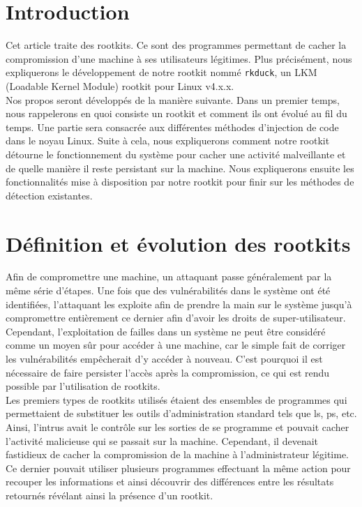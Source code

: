 \documentclass[11pt]{article}
\begin{document}
\newcommand*{\escape}[1]{\texttt{\textbackslash#1}}
\newcommand*{\escapeI}[1]{\texttt{\expandafter\string\csname #1\endcsname}}
\newcommand*{\escapeII}[1]{\texttt{\char`\\#1}}


\section*{Introduction}

    Cet article traite des rootkits. Ce sont des programmes permettant de cacher la compromission d'une machine à ses utilisateurs légitimes. Plus précisément, nous expliquerons le développement de notre rootkit nommé \texttt{rkduck}, un LKM (Loadable Kernel Module) rootkit pour Linux v4.x.x. \\

    Nos propos seront développés de la manière suivante. Dans un premier temps, nous rappelerons en quoi consiste un rootkit et comment ils ont évolué au fil du temps. Une partie sera consacrée aux différentes méthodes d'injection de code dans le noyau Linux. Suite à cela, nous expliquerons comment notre rootkit détourne le fonctionnement du système pour cacher une activité malveillante et de quelle manière il reste persistant sur la machine. Nous expliquerons ensuite les fonctionnalités mise à disposition par notre rootkit pour finir sur les méthodes de détection existantes.

\section{Définition et évolution des rootkits}

    Afin de compromettre une machine, un attaquant passe généralement par la même série d'étapes. Une fois que des vulnérabilités dans le système ont été identifiées, l'attaquant les exploite afin de prendre la main sur le système jusqu'à compromettre entièrement ce dernier afin d'avoir les droits de super-utilisateur.
    Cependant, l'exploitation de failles dans un système ne peut être considéré comme un moyen sûr pour accéder à une machine, car le simple fait de corriger les vulnérabilités empêcherait d'y accéder à nouveau. C'est pourquoi il est nécessaire de faire persister l'accès après la compromission, ce qui est rendu possible par l'utilisation de rootkits.\\
    
    Les premiers types de rootkits utilisés étaient des ensembles de programmes qui permettaient de substituer les outils d'administration standard tels que ls, ps, etc. Ainsi, l'intrus avait le contrôle sur les sorties de se programme et pouvait cacher l'activité malicieuse qui se passait sur la machine. Cependant, il devenait fastidieux de cacher la compromission de la machine à l'administrateur légitime. Ce dernier pouvait utiliser plusieurs programmes effectuant la même action pour recouper les informations et ainsi découvrir des différences entre les résultats retournés révélant ainsi la présence d'un rootkit.\\
    
\end{document}
